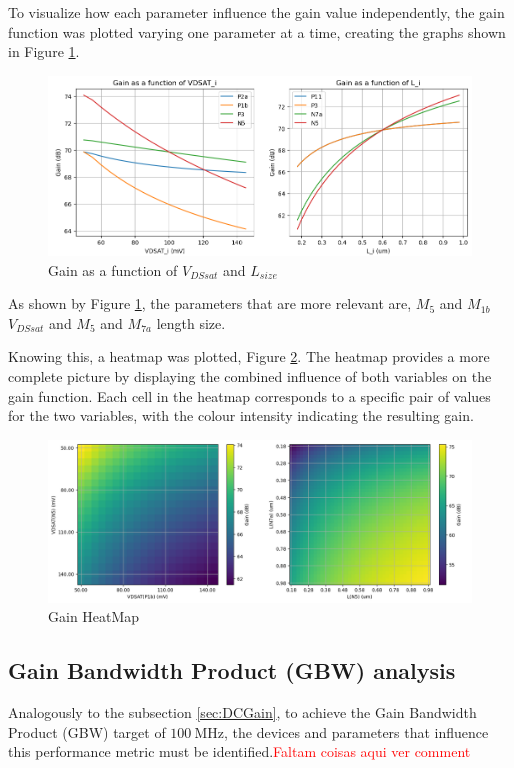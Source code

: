 To visualize how each parameter influence the gain value independently, the gain function was plotted varying one parameter at a time, creating the graphs shown in Figure \ref{fig:GainVariation}. 

\begin{figure}[H]
    \centering
    \includegraphics[width=1\textwidth]{Images/GainVariation.png}
    \caption{Gain as a function of $V_{DSsat}$ and $L_{size}$}
    \label{fig:GainVariation}
\end{figure}

As shown by Figure \ref{fig:GainVariation}, the parameters that are more relevant are, $M_{5}$ and $M_{1b}$ $V_{DSsat}$ and $M_{5}$ and $M_{7a}$ length size.

Knowing this, a heatmap was plotted, Figure \ref{fig:GainHeatMap}. The heatmap provides a more complete picture by displaying the combined influence of both variables on the gain function. Each cell in the heatmap corresponds to a specific pair of values for the two variables, with the colour intensity indicating the resulting gain.

\begin{figure}[H]
    \centering
    \includegraphics[width=1\textwidth]{Images/GainHeatMap.png}
    \caption{Gain HeatMap}
    \label{fig:GainHeatMap}
\end{figure}


\subsection{Gain Bandwidth Product (GBW) analysis}
\label{sec:GBWPython}
Analogously to the subsection \ref{sec:DCGain}, to achieve the Gain Bandwidth Product (GBW) target of $\SI{100}{\mega\hertz}$, the devices and parameters that influence this performance metric must be identified.\textcolor{red}{Faltam coisas aqui ver comment}


